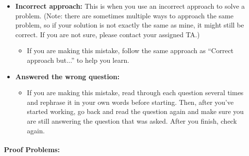 \documentclass[12pt]{article}
\begin{document}
\begin{itemize}
\begin{itemize}
\end{itemize}
\item \textbf{Incorrect approach:} This is when you use an incorrect approach to solve a problem. (Note: there are sometimes multiple ways to approach the same problem, so if your solution is not exactly the same as mine, it might still be correct. If you are not sure, please contact your assigned TA.)
\begin{itemize}
 \item If you are making this mistake, follow the same approach as ``Correct approach but...'' to help you learn.
 \end{itemize} 
\item \textbf{Answered the wrong question:} 
\begin{itemize}
\item If you are making this mistake, read through each question several times and rephrase it in your own words before starting. Then, after you've started working, go back and read the question again and make sure you are still answering the question that was asked. After you finish, check again.
\end{itemize}
\end{itemize}

\newpage
\paragraph{{\Large{Proof Problems:}}}
\end{document}
